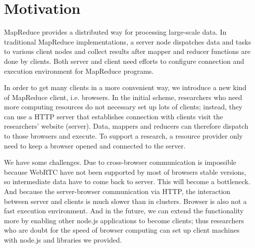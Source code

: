 \section{Motivation}

MapReduce\cite{mapreduce} provides a distributed way for processing large-scale data. In traditional MapReduce implementations, a server node dispatches data and tasks to various client nodes and collect results after mapper and reducer functions are done by clients. Both server and client need efforts to configure connection and execution environment for MapReduce programs.

In order to get many clients in a more convenient way, we introduce a new kind of MapReduce client, i.e. browsers. In the initial scheme, researchers who need more computing resources do not necessary set up lots of clients; instead, they can use a HTTP server that establishes connection with clients visit the researchers’ website (server).
Data, mappers and reducers can therefore dispatch to those browsers and execute. To support a research, a resource provider only need to keep a browser opened and connected to the server.

We have some challenges. Due to cross-browser communication is impossible because WebRTC\cite{webRTC} have not been supported by most of browsers stable versions, so intermediate data have to come back to server. This will become a bottleneck.
And because the server-browser communication via HTTP, the interaction between server and clients is much slower than in clusters. Browser is also not a fast execution environment.
And in the future, we can extend the functionality more by enabling other node.js\cite{nodejs} applications to become clients; thus researchers who are doubt for the speed of browser computing can set up client machines with node.js and libraries we provided.